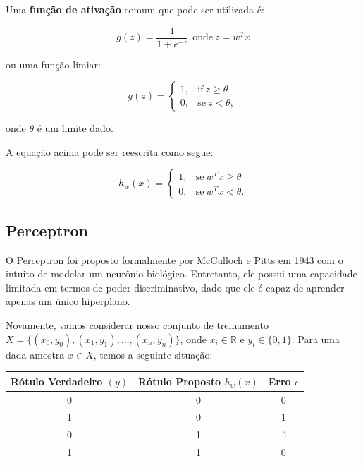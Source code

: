 Uma \textbf{função de ativação} comum que pode ser utilizada é:

\begin{equation}
\label{e.activation_function}
g(z) = \frac{1}{1 + e^{-z}}, \text{onde} \ z = w^Tx	
\end{equation}

ou uma função limiar:

\begin{equation}
\label{e.limiar_function}
g(z) =
   \begin{cases}
      1, & \text{if}\ z \geq \theta \\
      0, & \text{se}\ z < \theta,
    \end{cases}
\end{equation}

onde $\theta$ é um limite dado.

A equação acima pode ser reescrita como segue:

\begin{equation}
\label{e.limiar_function_r}
h_w(x) =
   \begin{cases}
      1, & \text{se}\ w^Tx \geq \theta \\
      0, & \text{se}\ w^Tx < \theta.
    \end{cases}
\end{equation}

\subsection{Perceptron}
\label{ss.perceptron}

O Perceptron foi proposto formalmente por McCulloch e Pitts em 1943 com o intuito de modelar um neurônio biológico. Entretanto, ele possui uma capacidade limitada em termos de poder discriminativo, dado que ele é capaz de aprender apenas um único hiperplano.

Novamente, vamos considerar nosso conjunto de treinamento $X = \{(x_0, y_0), (x_1, y_1), \dots, (x_n, y_n)\}$, onde $x_i \in \mathbb{R}$ e $y_i \in \{0, 1\}$. Para uma dada amostra $x \in X$, temos a seguinte situação:

\begin{table}[h]
\centering
\begin{tabular}{c|c|c}
\hline
\textbf{\small Rótulo Verdadeiro $(y)$} & \textbf{\small Rótulo Proposto $h_w(x)$} & \textbf{Erro} $\epsilon$\\\hline \hline
{\small 0} & {\small 0} & {\small 0}\\\hline
{\small 1} & {\small 0} & {\small 1}\\\hline
{\small 0} & {\small 1} & {\small -1}\\\hline
{\small 1} & {\small 1} & {\small 0}\\\hline
\end{tabular}
\label{t.perceptron}
\end{table}

